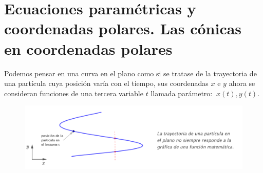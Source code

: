 \chapter{Ecuaciones paramétricas y coordenadas polares. Las cónicas en coordenadas polares}

\setlength{\parindent}{0cm}

	

Podemos pensar en una curva en el plano como si se tratase de la trayectoria de una partícula cuya posición varía con el tiempo, sus coordenadas $x$ e $y$ ahora se consideran funciones de una tercera variable $t$ llamada parámetro: $\ x(t), y(t)$.

\begin{figure}[H]
	\centering
	\includegraphics[width=.8\textwidth]{img-polares/polares01.png}
	\end{figure}

